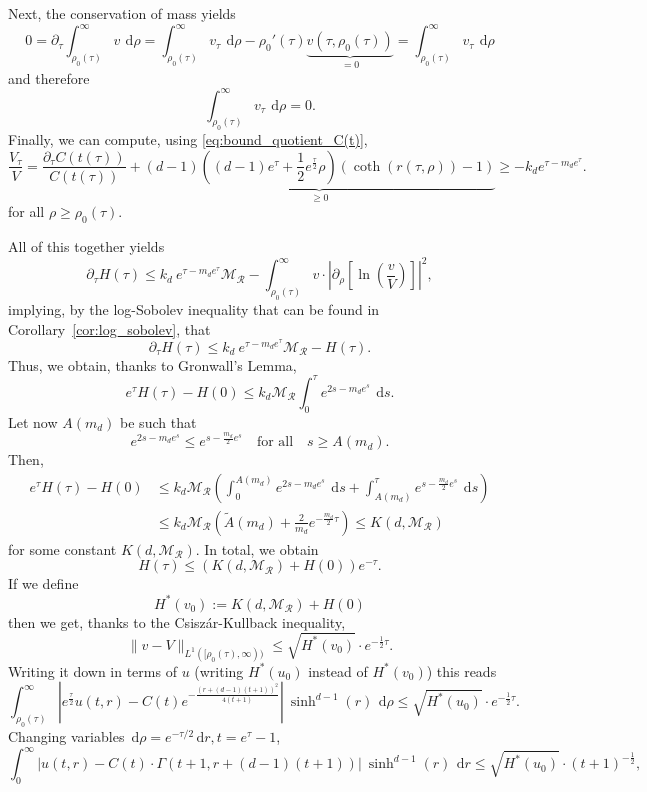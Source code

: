 \documentclass[12pt,longbibliography]{article}
\def\d{\,\mathrm{d}}
\def\d{\,\mathrm{d}}
\theoremstyle{definition}
\theoremstyle{remark}
\theoremstyle{example}
\begin{document}
Next, the conservation of mass yields
\[
0=\partial_\tau \int_{\rho_0(\tau)}^\infty v\ \d\rho = \int_{\rho_0(\tau)}^\infty v_\tau\ \d\rho -\rho_0'(\tau)\underbrace{v(\tau, \rho_0(\tau))}_{=0} = \int_{\rho_0(\tau)}^\infty v_\tau \ \d\rho
\]
and therefore
\[
\int_{\rho_0(\tau)}^\infty v_\tau \ \d\rho =0.
\]
Finally, we can compute, using \eqref{eq:bound_quotient_C(t)},
\[
\frac{V_\tau}{V}=\frac{\partial_\tau C(t(\tau))}{C(t(\tau))} + \underbrace{(d-1)\left((d-1)e^\tau + \frac{1}{2}e^\frac{\tau}{2}\rho\right)(\coth(r(\tau,\rho))-1)}_{\geq 0}\geq -k_d e^{\tau-m_d e^\tau}.
\]
for all $\rho\geq \rho_0(\tau)$.

All of this together yields
\[
\partial_\tau H(\tau) \leq k_d\ e^{\tau-m_d e^\tau} \mathcal{M}_{\mathcal{R}}  - \int_{\rho_0(\tau)}^\infty v \cdot\left|\partial_\rho\left[\ln\left(\frac{v}{V}\right)\right]\right|^2,
\]
implying, by the log-Sobolev inequality that can be found in Corollary~\ref{cor:log_sobolev}, that
\[
\partial_\tau H(\tau) \leq k_d\ e^{\tau-m_d e^\tau}\mathcal{M}_{\mathcal{R}}  - H(\tau).
\]
Thus, we obtain, thanks to Gronwall's Lemma,
\[
e^{ \tau} H(\tau) - H(0)\leq k_d \mathcal{M}_{\mathcal{R}} \int_0^\tau  e^{ 2s-m_d e^s}  \ \d s.
\]
Let now $A(m_d)$ be such that
\[
e^{2s-m_d e^s}\leq e^{s-\frac{m_d}{2} e^s}\quad\text{for all}\quad s\geq A(m_d).
\]
Then,
\[
\begin{aligned}
e^{\tau} H(\tau) - H(0)&\leq k_d\mathcal{M}_{\mathcal{R}}\left( \int_0^{A(m_d)}  e^{2s-m_d e^s}  \ \d s + \int_{A(m_d)}^\tau  e^{s-\frac{m_d}{2} e^s}  \ \d s\right)\\[10pt]
& \leq k_d\mathcal{M}_{\mathcal{R}}\left( \tilde{A}(m_d) + \frac{2}{m_d}e^{-\frac{m_d}{2}\tau} \right)\leq K(d, \mathcal{M}_{\mathcal{R}})
\end{aligned}
\]
for some constant $K(d, \mathcal{M}_{\mathcal{R}})$. In total, we obtain
\[
H(\tau)\leq \left(K(d, \mathcal{M}_{\mathcal{R}}) + H(0)\right)e^{- \tau}.
\]
If we define
\[
H^*(v_0):= K(d, \mathcal{M}_{\mathcal{R}})+ H(0)
\]
then we get, thanks to the Csiszár-Kullback inequality,
\[
\|v-V\|_{L^1([\rho_0(\tau), \infty))}\leq \sqrt{H^*(v_0)}\cdot e^{-\frac{1}{2}\tau}.
\]
Writing it down in terms of $u$ (writing $H^*(u_0)$ instead of $H^*(v_0)$) this reads
\[
\int_{\rho_0(\tau)}^\infty \left|e^\frac{\tau}{2} u(t,r) - C(t)e^{-\frac{\left(r+(d-1)(t+1)\right)^2}{4(t+1)}}  \right|\ \sinh^{d-1}(r)\ \d \rho\leq \sqrt{H^*(u_0)}\cdot e^{-\frac{1}{2}\tau}.
\]
Changing variables $\d \rho = e^{-\tau/2}\d r, t= e^\tau-1$,
\[
\int_{0}^\infty \left| u(t,r) - C(t)\cdot\Gamma(t+1, r+(d-1)(t+1))  \right|\ \sinh^{d-1}(r)\ \d r\leq \sqrt{H^*(u_0)}\cdot (t+1)^{-\frac{1}{2}},
\]
\end{document}
